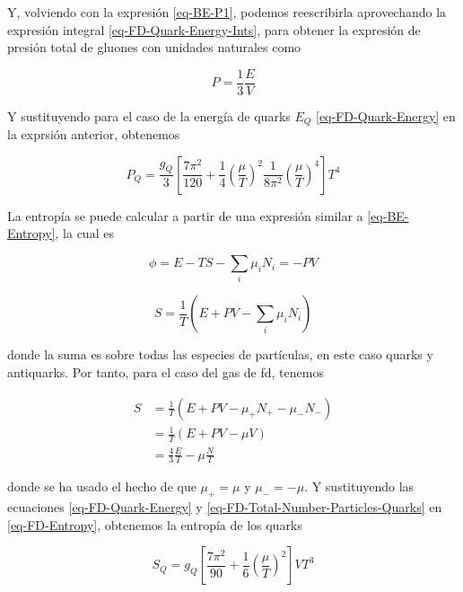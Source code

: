 Y, volviendo con la expresión \eqref{eq-BE-P1}, podemos reescribirla aprovechando la expresión integral \eqref{eq-FD-Quark-Energy-Ints}, para obtener la expresión de presión total de gluones con unidades naturales como

\begin{equation}
P = \frac{1}{3} \frac{E}{V}
\end{equation}

Y sustituyendo para el caso de la energía de quarks ${E}_{Q}$ \eqref{eq-FD-Quark-Energy} en la exprsión anterior, obtenemos

\begin{equation}\label{eq-FD-Quark-Pressure}
{P}_{Q} = \frac{{g}_{Q}}{3} \left[\frac{7 {\pi}^{2}}{120} + \frac{1}{4} \left(\frac{\mu}{T} \right)^{2} \frac{1}{8{\pi}^{2}} \left(\frac{\mu}{T} \right)^{4} \right] {T}^{4}
\end{equation}

La entropía se puede calcular a partir de una expresión similar a \eqref{eq-BE-Entropy}, la cual es

\begin{equation}
\phi = E -TS - \sum_{i}{\mu}_{i} {N}_{i} = - PV
\end{equation}

\begin{equation}
S = \frac{1}{T} \left(E + PV - \sum_{i} {\mu}_{i} {N}_{i} \right)
\end{equation}

donde la suma es sobre todas las especies de partículas, en este caso quarks y antiquarks. Por tanto, para el caso del gas de \acrshort{fd}, tenemos 

\begin{equation}\label{eq-FD-Entropy}
\begin{split}
S & = \frac{1}{T} \left(E + PV - {\mu}_{+} {N}_{+} - {\mu}_{-} {N}_{-} \right)\\
& = \frac{1}{T} \left(E + PV - \mu V \right) \\
& = \frac{4}{3} \frac{E}{T} - \mu \frac{N}{T}
\end{split}
\end{equation}

donde se ha usado el hecho de que ${\mu}_{+} = \mu$ y ${\mu}_{-} = - \mu$. Y sustituyendo las ecuaciones \eqref{eq-FD-Quark-Energy} y \eqref{eq-FD-Total-Number-Particles-Quarks} en \eqref{eq-FD-Entropy}, obtenemos la entropía de los quarks

\begin{equation}\label{eq-FD-Quark-Entropy}
{S}_{Q} = {g}_{Q} \left[\frac{7{\pi}^{2}}{90} + \frac{1}{6} \left(\frac{\mu}{T} \right)^{2} \right]V{T}^{3}
\end{equation}


